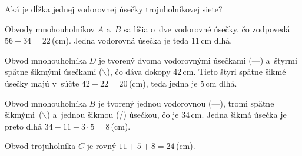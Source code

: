 {%
\napad
Aká je dĺžka jednej vodorovnej úsečky trojuholníkovej siete?

\riesenie
Obvody mnohouholníkov $A$ a~$B$ sa líšia o~dve vodorovné úsečky, čo zodpovedá $56-34=22$\,(cm).
Jedna vodorovná úsečka je teda 11\,cm dlhá.

Obvod mnohouholníka $D$ je tvorený dvoma vodorovnými úsečkami (---) a~štyrmi spätne šikmými úsečkami ($\backslash$), čo dáva dokopy 42\,cm.
Tieto štyri spätne šikmé úsečky majú v~súčte $42-22=20$\,(cm), teda jedna je 5\,cm dlhá.

Obvod mnohouholníka $B$ je tvorený jednou vodorovnou (---), tromi spätne šikmými~($\backslash$) a~jednou šikmou (/) úsečkou, čo je 34\,cm.
Jedna šikmá úsečka je preto dlhá $34-11-3\cdot5=8$\,(cm).

Obvod trojuholníka $C$ je rovný $11+5+8=24$\,(cm).
}


